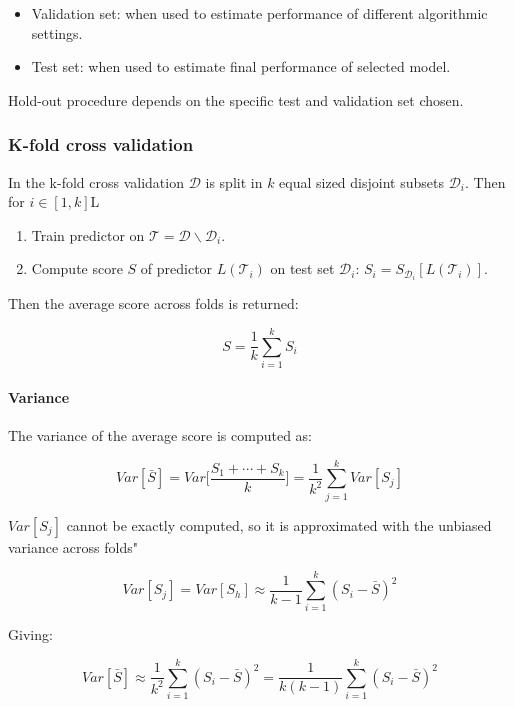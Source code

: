 		\begin{multicols}{2}
			\begin{itemize}
				\item Validation set: when used to estimate performance of different algorithmic settings.
				\item Test set: when used to estimate final performance of selected model.
			\end{itemize}
		\end{multicols}

		Hold-out procedure depends on the specific test and validation set chosen.

		\subsubsection{K-fold cross validation}
		In the k-fold cross validation $\mathcal{D}$ is split in $k$ equal sized disjoint subsets $\mathcal{D}_i$.
		Then for $i\in[1,k]$L

		\begin{multicols}{2}
			\begin{enumerate}
				\item Train predictor on $\mathcal{T} = \mathcal{D}\backslash\mathcal{D}_i$.
				\item Compute score $S$ of predictor $L(\mathcal{T}_i)$ on test set $\mathcal{D}_i$: $S_i = S_{\mathcal{D}_i}[L(\mathcal{T}_i)]$.
			\end{enumerate}
		\end{multicols}

		Then the average score across folds is returned:

		$$S = \frac{1}{k}\sum\limits_{i=1}^k S_i$$

			\paragraph{Variance}
			The variance of the average score is computed as:

			$$Var[\bar{S}] = Var\biggl[\frac{S_1+\cdots + S_k}{k}\biggr] = \frac{1}{k^2}\sum\limits_{j=1}^k Var[S_j]$$

			$Var[S_j]$ cannot be exactly computed, so it is approximated with the unbiased variance across folds"

			$$Var[S_j] = Var[S_h]\approx \frac{1}{k-1} \sum\limits_{i=1}^k(S_i-\bar{S})^2$$

			Giving:

			$$Var[\bar{S}] \approx \frac{1}{k^2}\sum\limits_{i=1}^k(S_i-\bar{S})^2 = \frac{1}{k(k-1)}\sum\limits_{i=1}^k(S_i - \bar{S})^2$$

